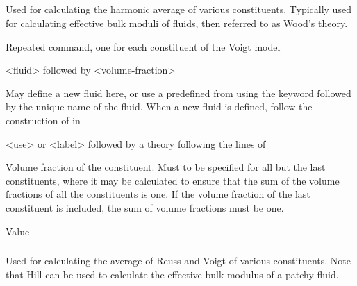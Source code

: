 {\subparagraph{}
 \slist
   \item \Description Used for calculating the harmonic average of various constituents. Typically used for calculating effective bulk moduli of fluids, then referred to as Wood's theory.
   \item \Argument
   \item \Default
 \elist

 \slist
   \item \Description Repeated command, one for each constituent of the Voigt model
   \item \Argument <fluid> followed by <volume-fraction>
   \item \Default
 \elist

 \slist
   \item \Description May define a new fluid here, or use a predefined  from  using the keyword  followed by the unique name of the fluid. When a new fluid is defined, follow the construction of  in 
   \item \Argument <use> or <label> followed by a theory following the lines of 
   \item \Default
 \elist

 \slist
   \item \Description Volume fraction of the constituent. Must to be specified for all but the last constituents, where it may be calculated to ensure that the sum of the volume fractions of all the constituents is one. If the volume fraction of the last constituent is included, the sum of volume fractions must be one.
   \item \Argument Value
   \item \Default
 \elist

\subparagraph{}
 \slist
   \item \Description Used for calculating the average of Reuss and Voigt of various constituents. Note that Hill can be used to calculate the effective bulk modulus of a patchy fluid.
   \item \Argument
   \item \Default
 \elist

}
